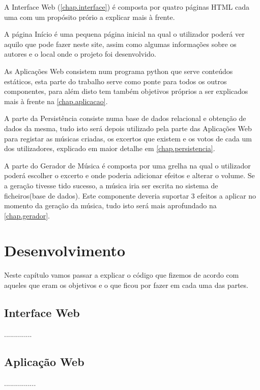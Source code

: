 \documentclass{report}
\begin{document}
A Interface Web (\autoref{chap.interface}) é composta por quatro páginas HTML cada uma com 
um propósito prório a explicar mais à frente.

A página Início é uma pequena página inicial na qual o utilizador poderá ver 
aquilo que pode fazer neste site, assim como algumas informações sobre os autores e o local onde o projeto foi desenvolvido.
	
As Aplicações Web consistem num programa python que serve conteúdos estáticos, 
esta parte do trabalho serve como ponte para todos os outros componentes, para além disto tem também objetivos próprios a ser 
explicados mais à frente na \autoref{chap.aplicacao}.

A parte da Persistência consiste numa base de dados relacional e obtenção de dados da mesma, 
tudo isto será depois utilizado pela parte das Aplicações Web para registar as músicas criadas, os excertos que existem e os 
votos de cada um dos utilizadores, explicado em maior detalhe em \autoref{chap.persistencia}.

A parte do Gerador de Música é composta por uma grelha na qual o utilizador poderá escolher o excerto e onde poderia adicionar efeitos e alterar o volume. Se a geração tivesse tido sucesso, a música iria ser escrita no sistema de
ficheiros(base de dados). Este componente deveria suportar 3 efeitos a aplicar no momento da geração
da música, tudo isto será mais aprofundado na \autoref{chap.gerador}.

\newpage
\chapter{Desenvolvimento}
\label{chap.desenvolvimento}

Neste capítulo vamos passar a explicar o código que fizemos de acordo com aqueles que eram os objetivos e o que ficou por fazer 
em cada uma das partes.
	
\section{Interface Web}
\label{chap.interface}
..............
\newpage
\section{Aplicação Web}
\label{chap.aplicacao}
................
\newpage
\end{document}
